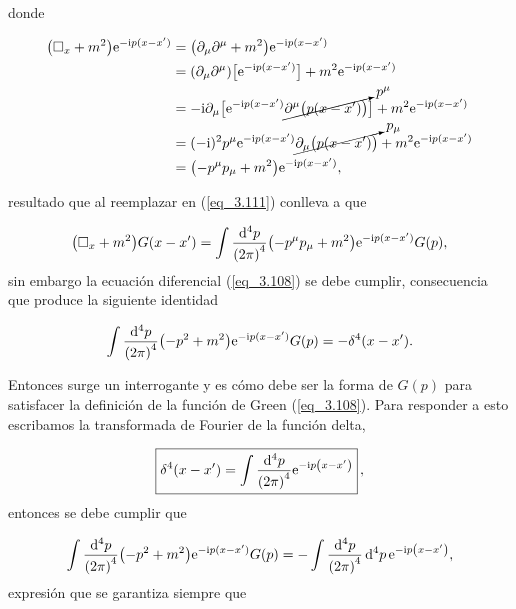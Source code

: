  donde 

 \begin{equation*}
     \begin{split}
         \qty(\square _{x}+m^{2})\mathrm{e}^{-\mathrm{i} p(x-x^\prime)} &= \qty(\partial_\mu \partial^\mu +m^{2})\mathrm{e}^{-\mathrm{i} p(x-x^\prime)}\\
         &= \qty(\partial_\mu \partial^\mu) \qty\big[ \mathrm{e}^{-\mathrm{i} p(x-x^\prime)}] + m^{2}\mathrm{e}^{-\mathrm{i} p(x-x^\prime)} \\
         &= -\mathrm{i} \partial_\mu \qty\big[\mathrm{e}^{-\mathrm{i} p(x-x^\prime)} \cancelto{p^\mu}{\partial^\mu \qty\big(p(x-x^\prime))}] + m^{2}\mathrm{e}^{-\mathrm{i} p(x-x^\prime)}\\
         &= (-\mathrm{i})^2 p^\mu \mathrm{e}^{-\mathrm{i} p(x-x^\prime)}  \cancelto{p_\mu}{\partial_\mu \qty\big(p(x-x^\prime))} + m^{2}\mathrm{e}^{-\mathrm{i} p(x-x^\prime)} \\
         &= \qty(-p^\mu p_\mu + m^2) \mathrm{e}^{-\mathrm{i} p(x-x^\prime)},
     \end{split}
 \end{equation*}

resultado que al reemplazar en (\ref{eq_3.111}) conlleva a que

\begin{equation} 
    \qty(\square _{x}+m^{2}) G\qty( x-x^\prime ) = \int \frac{\dd[4]{p}}{\qty(2\pi)^4} \qty(-p^\mu p_\mu + m^2) \mathrm{e}^{-\mathrm{i} p(x-x^\prime)} G(p),
\end{equation}
sin embargo la ecuación diferencial (\ref{eq_3.108}) se debe cumplir, consecuencia que produce la siguiente identidad

\begin{equation}
    \int \frac{\dd[4]{p}}{\qty(2\pi)^4} \qty(-p^2+ m^2) \mathrm{e}^{-\mathrm{i} p(x-x^\prime)} G(p) = - \delta^4 \qty(x-x^\prime).
\end{equation}

Entonces surge un interrogante y es cómo debe ser la forma de $G(p)$ para satisfacer la definición de la función de Green (\ref{eq_3.108}). Para responder a esto escribamos la transformada de Fourier de la función delta,

\begin{equation}
	\boxed{
    \delta^4 \qty(x-x^\prime) = \int \frac{\dd[4]{p}}{\qty(2\pi)^4} \mathrm{e}^{-\mathrm{i} p \qty(x-x^\prime)}
	} \, , 
\end{equation}
entonces se debe cumplir que 

\begin{equation}
    \int \frac{\dd[4]{p}}{\qty(2\pi)^4} \qty(-p^2+ m^2) \mathrm{e}^{-\mathrm{i} p(x-x^\prime)} G(p) = - \int \frac{\dd[4]{p}}{\qty(2\pi)^4} \dd[4]{p} \mathrm{e}^{-\mathrm{i} p \qty(x-x^\prime)},
\end{equation}
expresión que se garantiza siempre que 


